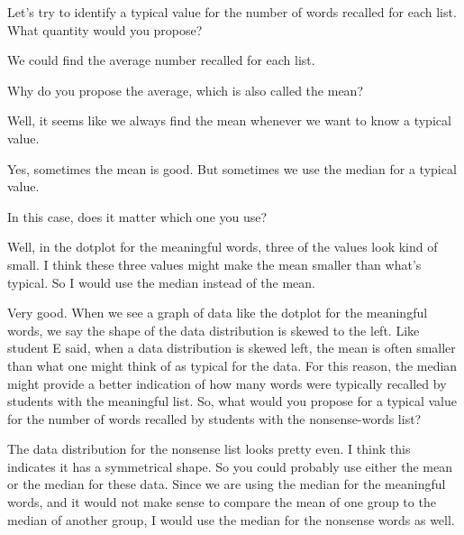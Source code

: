 {\begin{scriptlist}
      \item [Teacher:] Let's try to identify a typical value for the number of words recalled for each list. What quantity would you propose?

      \item [Student D:] We could find the average number recalled for each list.

      \item [Teacher:] Why do you propose the average, which is also called the mean?

      \item [Student D:] Well, it seems like we always find the mean whenever we want to know a typical value.

      \item [Student E:] Yes, sometimes the mean is good. But sometimes we use the median for a typical value.\vspace{\baselineskip}

      \item [Teacher:] In this case, does it matter which one you use?\vspace{\baselineskip}

      \item [Student E:] Well, in the dotplot for the meaningful words, three of the values look kind of small. I think these three values might make the mean smaller than what's typical. So I would use the median instead of the mean.

      \item [Teacher:] Very good. When we see a graph of data like the dotplot for the meaningful words, we say the shape of the data distribution is skewed to the left. Like student E said, when a data distribution is skewed left, the mean is often smaller than what one might think of as typical for the data. For this reason, the median might provide a better indication of how many words were typically recalled by students with the meaningful list. So, what would you propose for a typical value for the number of words recalled by students with the nonsense-words list?

      \item [Student E:] The data distribution for the nonsense list looks pretty even. I think this indicates it has a symmetrical shape. So you could probably use either the mean or the median for these data. Since we are using the median for the meaningful words, and it would not make sense to compare the mean of one group to the median of another group, I would use the median for the nonsense words as well.


\end{scriptlist}}
